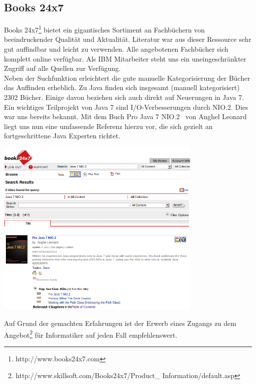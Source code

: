 \subsection{Books 24x7}
Books 24x7\footnote{http://www.books24x7.com} bietet ein gigantisches Sortiment an Fachbüchern von beeindruckender Qualität und Aktualität. Literatur war aus dieser Ressource sehr gut auffindbar und leicht zu verwenden. Alle angebotenen Fachbücher sich komplett online verfügbar. Als IBM Mitarbeiter steht uns ein uneingeschränkter Zugriff auf alle Quellen zur Verfügung.\\

Neben der Suchfunktion erleichtert die gute manuelle Kategorisierung der Bücher das Auffinden erheblich. Zu Java finden sich insgesamt (manuell kategorisiert) 2302 Bücher. Einige davon beziehen sich auch direkt auf Neuerungen in Java 7.\\

Ein wichtiges Teilprojekt von Java 7 sind I/O-Verbesserungen durch NIO.2. Dies war uns bereits bekannt. Mit dem Buch \glqq Pro Java 7 NIO.2\grqq\cite{b247nio2} ~von Anghel Leonard liegt uns nun eine umfassende Referenz hierzu vor, die sich gezielt an fortgeschrittene Java Experten richtet.

\begin{center}
\includegraphics[width=10cm]{images/books247.png}
\end{center}

Auf Grund der gemachten Erfahrungen ist der Erwerb eines Zugangs zu dem Angebot\footnote{http://www.skillsoft.com/Books24x7/Product\_ Information/default.asp} für Informatiker auf jeden Fall empfehlenswert.
%

